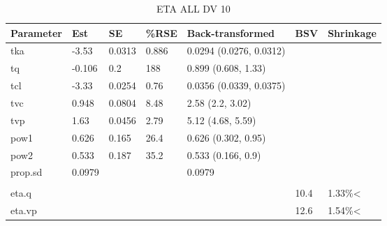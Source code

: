 \begin{table}
\centering\centering
\caption{ETA ALL DV 10}
\centering
\fontsize{8}{10}\selectfont
\begin{tabular}[t]{lllllll}
\toprule
\textbf{Parameter} & \textbf{Est} & \textbf{SE} & \textbf{\%RSE} & \textbf{Back-transformed} & \textbf{BSV} & \textbf{Shrinkage}\\
\midrule
tka & -3.53 & 0.0313 & 0.886 & 0.0294 (0.0276, 0.0312) &  & \\
\midrule
tq & -0.106 & 0.2 & 188 & 0.899 (0.608, 1.33) &  & \\
\midrule
tcl & -3.33 & 0.0254 & 0.76 & 0.0356 (0.0339, 0.0375) &  & \\
\midrule
tvc & 0.948 & 0.0804 & 8.48 & 2.58 (2.2, 3.02) &  & \\
\midrule
tvp & 1.63 & 0.0456 & 2.79 & 5.12 (4.68, 5.59) &  & \\
\midrule
pow1 & 0.626 & 0.165 & 26.4 & 0.626 (0.302, 0.95) &  & \\
\midrule
pow2 & 0.533 & 0.187 & 35.2 & 0.533 (0.166, 0.9) &  & \\
\midrule
prop.sd & 0.0979 &  &  & 0.0979 &  & \\
\midrule\\
eta.q &  &  &  &  & 10.4 & 1.33\%<\\
\midrule
eta.vp &  &  &  &  & 12.6 & 1.54\%<\\
\bottomrule
\end{tabular}
\end{table}